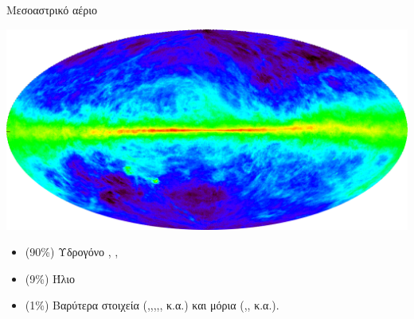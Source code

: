 \documentclass{beamer}
\begin{document}
\begin{frame}{Μεσοαστρικό αέριο}%
\begin{center}
	\includegraphics[width=1\linewidth]{../Document/Images/21}
\end{center}
		\begin{itemize}
			\item{(90\%) Υδρογόνο  , , }	
			\item{(9\%) Ήλιο }	
			\item{(1\%) Βαρύτερα στοιχεία  (,,,,, κ.α.) και μόρια (,, κ.α.).}
		\end{itemize}

\end{frame}
\end{document}
